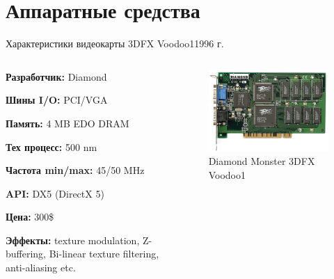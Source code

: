 \documentclass{beamer}
\begin{document}
\section{Аппаратные средства}

\begin{frame}{Характеристики видеокарты 3DFX Voodoo1}{1996 г.}
	\begin{columns}
		\begin{column}{0.5\textwidth}
			\textbf{Разработчик:} Diamond
			
			\textbf{Шины I/O:} PCI/VGA
			
			\textbf{Память:} 4 MB EDO DRAM
			
			\textbf{Тех процесс:} 500 nm
			
			\textbf{Частота min/max:} 45/50 MHz
			
			\textbf{API:}  DX5 (DirectX 5)
			
			\textbf{Цена:} 300\$
			
			\textbf{Эффекты:} texture modulation, Z-buffering, Bi-linear texture filtering, anti-aliasing etc.
		\end{column}
		\begin{column}{0.5\textwidth}
			\begin{figure} 
				\includegraphics[width=\textwidth]{images/Diamond_Monster_3D_3DFX_Voodoo1.png}
				\caption {Diamond Monster 3DFX Voodoo1}
			\end{figure}
			
		\end{column}
	\end{columns}
\end{frame}
\end{document}
